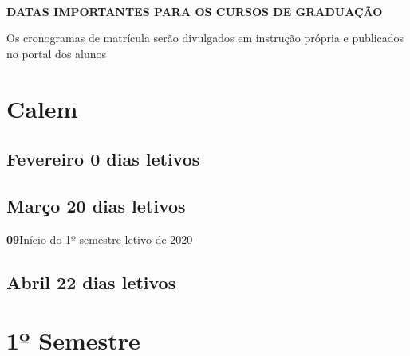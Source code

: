\documentclass[thesis]{hmcposter}
\begin{document}
\begin{poster}
\begin{center}
\begin{table}
{\begin{tabular}{|c|c|c|c|c|c|c|}
\end{tabular}
}
\end{table}
\null
\end{center}
\vfill
\null
\columnbreak
~
\vfill
\begin{center}
\large \textbf{DATAS IMPORTANTES PARA OS CURSOS DE GRADUAÇÃO}
\newline
\null
\newline
\begin{table}
\centering
{}
\end{table}
\newline
\null
\newline
Os cronogramas de matrícula serão divulgados em instrução própria e publicados no portal dos alunos
\end{center}
\vfill
\null
\newpage\section{\color{hmcorange}Calem}\subsection{Fevereiro \hfill 0 dias letivos} \null \newline \subsection{Março \hfill 20 dias letivos}\textbf{09}\qquad Início do 1º semestre letivo de 2020 \subsection{Abril \hfill 22 dias letivos} \null \newline \vfill\null
\columnbreak
\section{\hfill \color{hmcorange}1º Semestre}

\end{poster}
\end{document}
